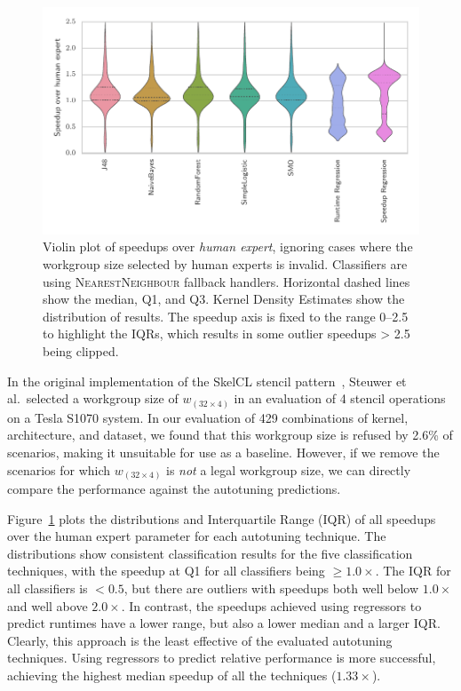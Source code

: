 \documentclass{acaces}
\begin{document}
\begin{figure}
\centering
\includegraphics[width=.75\columnwidth]{speedup-distributions}
\vspace{-1.5em}
\caption[Speedup results over human expert]{%
  Violin plot of speedups over \emph{human expert}, ignoring cases
  where the workgroup size selected by human experts is
  invalid. Classifiers are using \textsc{NearestNeighbour} fallback
  handlers. Horizontal dashed lines show the median, Q1, and
  Q3. Kernel Density Estimates show the distribution of results. The
  speedup axis is fixed to the range 0--2.5 to highlight the IQRs,
  which results in some outlier speedups > 2.5 being clipped.
  \vspace{-.8em} %
}
\label{fig:speedup-distributions}
\end{figure}

In the original implementation of the SkelCL stencil
pattern~\cite{Steuwer2014a}, Steuwer et al.\ selected a workgroup size
of $w_{(32 \times 4)}$ in an evaluation of 4 stencil operations on a
Tesla S1070 system. In our evaluation of 429 combinations of kernel,
architecture, and dataset, we found that this workgroup size is
refused by 2.6\% of scenarios, making it unsuitable for use as a
baseline. However, if we remove the scenarios for which
$w_{(32 \times 4)}$ is \emph{not} a legal workgroup size, we can
directly compare the performance against the autotuning predictions.

Figure~\ref{fig:speedup-distributions} plots the distributions and
Interquartile Range (IQR) of all speedups over the human expert
parameter for each autotuning technique. The distributions show
consistent classification results for the five classification
techniques, with the speedup at Q1 for all classifiers being
$\ge 1.0\times$. The IQR for all classifiers is $< 0.5$, but there are
outliers with speedups both well below $1.0\times$ and well above
$2.0\times$. In contrast, the speedups achieved using regressors to
predict runtimes have a lower range, but also a lower median and a
larger IQR. Clearly, this approach is the least effective of the
evaluated autotuning techniques. Using regressors to predict relative
performance is more successful, achieving the highest median speedup
of all the techniques ($1.33\times$).
\end{document}
